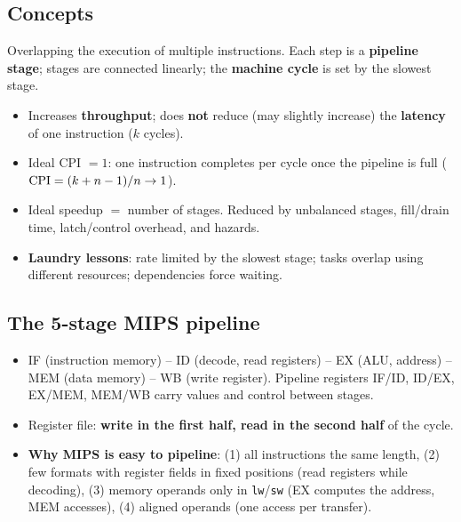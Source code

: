 \documentclass[11pt]{article}
\begin{document}
\subsection{Concepts}
\begin{definition}[Pipelining]
Overlapping the execution of multiple instructions. Each step is a
\textbf{pipeline stage}; stages are connected linearly; the \textbf{machine
cycle} is set by the slowest stage.
\end{definition}
\begin{itemize}[leftmargin=*]
  \item Increases \textbf{throughput}; does \textbf{not} reduce (may slightly
  increase) the \textbf{latency} of one instruction ($k$ cycles).
  \item Ideal CPI $=1$: one instruction completes per cycle once the pipeline
  is full ($\mathrm{CPI} = (k+n-1)/n\to1$).
  \item Ideal speedup $=$ number of stages. Reduced by unbalanced stages,
  fill/drain time, latch/control overhead, and hazards.
  \item \textbf{Laundry lessons}: rate limited by the slowest stage; tasks
  overlap using different resources; dependencies force waiting.
\end{itemize}

\subsection{The 5-stage MIPS pipeline}
\begin{itemize}[leftmargin=*]
  \item IF (instruction memory) -- ID (decode, read registers) -- EX (ALU,
  address) -- MEM (data memory) -- WB (write register). Pipeline registers
  IF/ID, ID/EX, EX/MEM, MEM/WB carry values and control between stages.
  \item Register file: \textbf{write in the first half, read in the second
  half} of the cycle.
  \item \textbf{Why MIPS is easy to pipeline}: (1) all instructions the same
  length, (2) few formats with register fields in fixed positions (read
  registers while decoding), (3) memory operands only in \texttt{lw}/\texttt{sw}
  (EX computes the address, MEM accesses), (4) aligned operands (one access
  per transfer).
\end{itemize}
\end{document}
